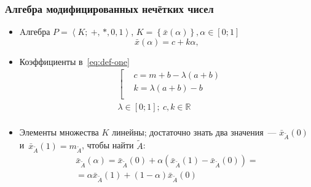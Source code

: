 \documentclass[12pt]{beamer}
\begin{document}

\begin{frame}
  \frametitle{Алгебра модифицированных нечётких чисел}
  \begin{itemize}
    \item Aлгебра $P=\left\langle K ;\ +,\,*, 0, 1 \right\rangle$, $K=\left\lbrace \bar x(\alpha) \right\rbrace, \alpha \in \left[0; 1\right]$
      \begin{equation}
        \label{eq:def-one}
        \bar{x}\left( \alpha  \right)=c+k\alpha,
      \end{equation}
    \item Коэффициенты в~\eqref{eq:def-one}
      \begin{equation}
        \label{eq:modified-number-from-abm}
        \begin{aligned}
          & \left[ \begin{aligned}
          & c=m+b-\lambda \left( a+b \right) \\ 
          & k=\lambda \left( a+b \right)-b \\ 
        \end{aligned} \right. \\ 
        & \lambda \in \left[ 0;1 \right];\ c,k\in \mathbb{R} \\ 
      \end{aligned}
      \end{equation}
    \item Элементы множества $K$ линейны; достаточно знать два значения~--- $\bar{x}_{\tilde A}\left( 0 \right)$ и~$\bar{x}_{\tilde A}\left( 1 \right)=m_{\tilde A}$, чтобы найти $\tilde{A}$:
      \begin{gather}
        \label{eq:isomorphic-field}
        \bar{x}_{\tilde A}\left( \alpha \right)=\bar{x}_{\tilde A}\left( 0 \right)+\alpha \left(\bar{x}_{\tilde A}\left( 1 \right)-\bar{x}_{\tilde A}\left(0 \right) \right)=\\
        =\alpha \bar{x}_{\tilde A}\left( 1 \right)+\left( 1-\alpha  \right) \bar{x}_{\tilde A}\left( 0 \right)
      \end{gather}
  \end{itemize}
\end{frame}

\end{document}
